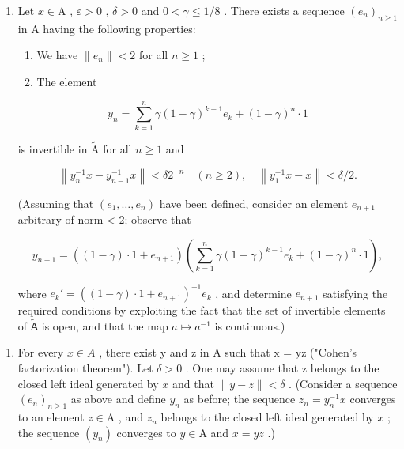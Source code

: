 \begin{enumerate}
\def\labelenumi{\alph{enumi})}
\setcounter{enumi}{3}
\tightlist
\item
  Let \(x \in \mathrm{A}\) , \(\varepsilon > 0\) , \(\delta > 0\) and \(0 < \gamma \leqslant 1/8\) . There exists a sequence \((e_n)_{n \geqslant 1}\) in A having the following properties:

\begin{enumerate}
\def\labelenumi{(\roman{enumi})}
\item
  We have \(\|e_{n}\| < 2\) for all \(n \geqslant 1\) ;
\item
  The element
\end{enumerate}

\[
y _ {n} = \sum_ {k = 1} ^ {n} \gamma (1 - \gamma) ^ {k - 1} e _ {k} + (1 - \gamma) ^ {n} \cdot 1
\]

is invertible in \(\widetilde{\mathrm{A}}\) for all \(n\geqslant 1\) and

\[
\left\| y _ {n} ^ {- 1} x - y _ {n - 1} ^ {- 1} x \right\| <   \delta 2 ^ {- n} \quad (n \geqslant 2), \quad \left\| y _ {1} ^ {- 1} x - x \right\| <   \delta / 2.
\]

(Assuming that \((e_{1},\ldots,e_{n})\) have been defined, consider an element \(e_{n+1}\) arbitrary of norm \textless{} 2; observe that

\[
y _ {n + 1} = ((1 - \gamma) \cdot 1 + e _ {n + 1}) \left(\sum_ {k = 1} ^ {n} \gamma (1 - \gamma) ^ {k - 1} e _ {k} ^ {\prime} + (1 - \gamma) ^ {n} \cdot 1\right),
\]

where \(e_k' = ((1 - \gamma) \cdot 1 + e_{n+1})^{-1} e_k\) , and determine \(e_{n+1}\) satisfying the required conditions by exploiting the fact that the set of invertible elements of \(\widetilde{\mathsf{A}}\) is open, and that the map \(a \mapsto a^{-1}\) is continuous.)
\end{enumerate}

\begin{enumerate}
\def\labelenumi{\alph{enumi})}
\setcounter{enumi}{4}
\tightlist
\item
  For every \(x \in A\) , there exist y and z in A such that x = yz ("Cohen's factorization theorem"). Let \(\delta > 0\) . One may assume that z belongs to the closed left ideal generated by \(x\) and that \(\|y-z\|<\delta\) . (Consider a sequence \((e_{n})_{n\geqslant1}\) as above and define \(y_{n}\) as before; the sequence \(z_{n}=y_{n}^{-1}x\) converges to an element \(z\in\mathrm{A}\) , and \(z_{n}\) belongs to the closed left ideal generated by \(x\) ; the sequence \((y_{n})\) converges to \(y\in\mathrm{A}\) and \(x=yz\) .)
\end{enumerate}

